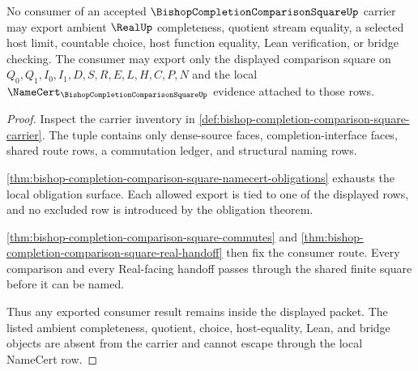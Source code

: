 \begin{theorem}
\label{thm:bishop-completion-comparison-square-nonescape}
No consumer of an accepted $\BishopCompletionComparisonSquareUp$ carrier may export ambient $\RealUp$ completeness, quotient stream equality, a selected host limit, countable choice, host function equality, Lean verification, or bridge checking. The consumer may export only the displayed comparison square on $Q_0,Q_1,I_0,I_1,D,S,R,E,L,H,C,P,N$ and the local $\NameCert_{\BishopCompletionComparisonSquareUp}$ evidence attached to those rows.
\end{theorem}
\begin{proof}
Inspect the carrier inventory in \autoref{def:bishop-completion-comparison-square-carrier}. The tuple contains only dense-source faces, completion-interface faces, shared route rows, a commutation ledger, and structural naming rows.

\autoref{thm:bishop-completion-comparison-square-namecert-obligations} exhausts the local obligation surface. Each allowed export is tied to one of the displayed rows, and no excluded row is introduced by the obligation theorem.

\autoref{thm:bishop-completion-comparison-square-commutes} and \autoref{thm:bishop-completion-comparison-square-real-handoff} then fix the consumer route. Every comparison and every Real-facing handoff passes through the shared finite square before it can be named.

Thus any exported consumer result remains inside the displayed packet. The listed ambient completeness, quotient, choice, host-equality, Lean, and bridge objects are absent from the carrier and cannot escape through the local NameCert row.
\end{proof}


